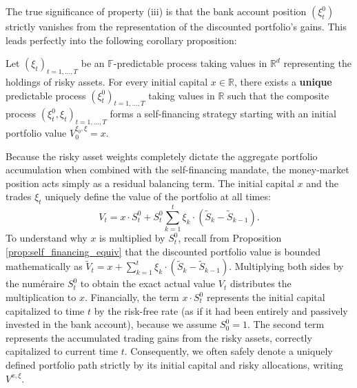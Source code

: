 The true significance of property (iii) is that the bank account position $(\xi_t^0)$ strictly vanishes from the representation of the discounted portfolio’s gains. This leads perfectly into the following corollary proposition:

\begin{proposition}
Let $(\xi_t)_{t=1, \dots, T}$ be an $\mathbb{F}$-predictable process taking values in $\mathbb{R}^d$ representing the holdings of risky assets. For every initial capital $x \in \mathbb{R}$, there exists a \textbf{unique} predictable process $(\xi_t^0)_{t=1, \dots, T}$ taking values in $\mathbb{R}$ such that the composite process $(\xi_t^0, \xi_t)_{t=1, \dots, T}$ forms a self-financing strategy starting with an initial portfolio value $V_0^{\xi_0, \xi} = x$.
\end{proposition}
Because the risky asset weights completely dictate the aggregate portfolio accumulation when combined with the self-financing mandate, the money-market position acts simply as a residual balancing term. The initial capital $x$ and the trades $\xi_t$ uniquely define the value of the portfolio at all times: 
$$
V_t = x \cdot S_t^0 + S_t^0 \sum_{k=1}^t \xi_k \cdot (\tilde{S}_k - \tilde{S}_{k-1}).
$$
To understand why $x$ is multiplied by $S_t^0$, recall from Proposition \ref{prop:self_financing_equiv} that the discounted portfolio value is bounded mathematically as $\tilde{V}_t = x + \sum_{k=1}^t \xi_k \cdot (\tilde{S}_k - \tilde{S}_{k-1})$. Multiplying both sides by the numéraire $S_t^0$ to obtain the exact actual value $V_t$ distributes the multiplication to $x$. Financially, the term $x \cdot S_t^0$ represents the initial capital capitalized to time $t$ by the risk-free rate (as if it had been entirely and passively invested in the bank account), because we assume $S_0^0 = 1$. The second term represents the accumulated trading gains from the risky assets, correctly capitalized to current time $t$. Consequently, we often safely denote a uniquely defined portfolio path strictly by its initial capital and risky allocations, writing $V^{x, \xi}$.
